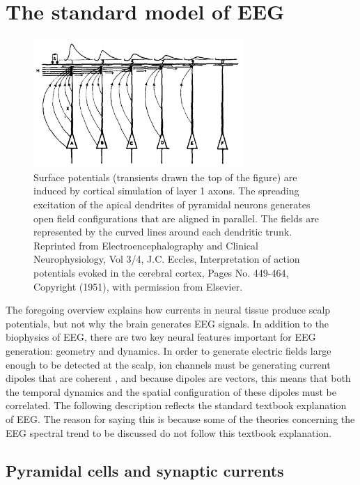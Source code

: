 \section{The standard model of EEG} \label{sec:standard_model}

\begin{figure}
\vspace{-15pt}
\includegraphics[width=80mm]{Figures/chapter1/Eccles_1951.png}
\vspace{-20pt}
\caption{  Surface potentials (transients drawn the top of the figure) are induced by cortical simulation of layer 1 axons. The spreading excitation of the apical dendrites of pyramidal neurons generates open field configurations that are aligned in parallel. The fields are represented by the curved lines around each dendritic trunk. Reprinted from Electroencephalography and Clinical Neurophysiology, Vol 3/4, J.C. Eccles, Interpretation of action potentials evoked in the cerebral cortex, Pages No. 449-464, Copyright (1951), with permission from Elsevier.
} \label{fig:eccles}
\end{figure}

The foregoing overview explains how currents in neural tissue produce scalp potentials, but not why the brain generates EEG signals. In addition to the biophysics of EEG, there are two key neural features important for EEG generation: geometry and dynamics. In order to generate electric fields large enough to be detected at the scalp, ion channels must be generating current dipoles that are coherent \cite{Buzsaki2012, Nunez2006}, and because dipoles are vectors, this means that both the temporal dynamics and the spatial configuration of these dipoles must be correlated. The following description reflects the standard textbook explanation of EEG. The reason for saying this is because some of the theories concerning the EEG spectral trend to be discussed do not follow this textbook explanation.

\subsection{Pyramidal cells and synaptic currents}

